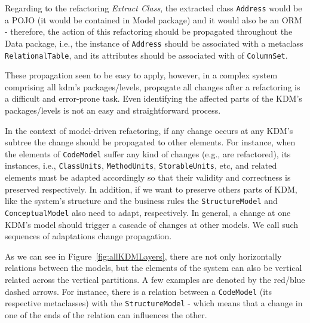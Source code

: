 Regarding to the refactoring \textit{Extract Class}, the extracted class \texttt{Address} would be a POJO (it would be contained in Model package) and it would also be an ORM - therefore, the action of this refactoring should be propagated throughout  the Data package, i.e., the instance of \texttt{Address} should be associated with a metaclass \texttt{RelationalTable}, and its attributes should be associated with  of \texttt{ColumnSet}.


These propagation seen to be easy to apply, however, in a complex system comprising all kdm's packages/levels, propagate all changes after a refactoring is a difficult and error-prone task. Even identifying the affected parts of the KDM's packages/levels is not an easy and straightforward process. 

In the context of model-driven  refactoring, if any change occurs at any KDM's subtree the change should be propagated to other elements.
%
%
For instance, when the elements of \texttt{CodeModel} suffer any kind of changes (e.g., are refactored), its instances, i.e., \texttt{ClassUnits}, \texttt{MethodUnits}, \texttt{StorableUnits}, etc, and related elements must be adapted accordingly so that their validity and correctness is preserved respectively. In addition, if we want to preserve others parts of KDM, like the system's structure and the business rules the  \texttt{StructureModel} and \texttt{ConceptualModel} also need to adapt, respectively. %
In general, a change at one KDM's model should trigger a cascade of changes at other models. We call such sequences of adaptations change propagation.

As we can see in Figure~\ref{fig:allKDMLayers}, there are not only horizontally relations between the models, but the elements of the system can also be vertical related across the vertical partitions. A few examples are denoted by the red/blue dashed arrows. For instance, there is a relation between a \texttt{CodeModel} (its respective metaclasses) with the \texttt{StructureModel} - which means that a change in one of the ends of the relation can influences the other.

